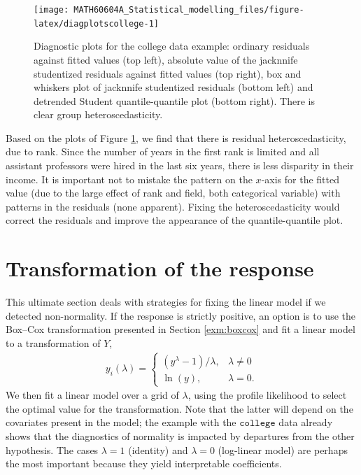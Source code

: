 \documentclass[
  11pt,
  letterpaper,
]{book}
\theoremstyle{definition}
\theoremstyle{definition}
\theoremstyle{definition}
\theoremstyle{remark}
\begin{document}
\begin{figure}

{\centering \texttt{[image: MATH60604A\_Statistical\_modelling\_files/figure-latex/diagplotscollege-1]} 

}

\caption{Diagnostic plots for the college data example: ordinary residuals against fitted values (top left), absolute value of the jacknnife studentized residuals against fitted values (top right), box and whiskers plot of jacknnife studentized residuals (bottom left) and detrended Student quantile-quantile plot (bottom right). There is clear group heteroscedasticity.}\label{fig:diagplotscollege}
\end{figure}

Based on the plots of Figure \ref{fig:diagplotscollege}, we find that there is residual heteroscedasticity, due to rank. Since the number of years in the first rank is limited and all assistant professors were hired in the last six years, there is less disparity in their income. It is important not to mistake the pattern on the \(x\)-axis for the fitted value (due to the large effect of rank and field, both categorical variable) with patterns in the residuals (none apparent). Fixing the heteroscedasticity would correct the residuals and improve the appearance of the quantile-quantile plot.

\hypertarget{transformation-response}{%
\section{Transformation of the response}\label{transformation-response}}

This ultimate section deals with strategies for fixing the linear model if we detected non-normality. If the response is strictly positive, an option is to use the Box--Cox transformation presented in Section \ref{exm:boxcox} and fit a linear model to a transformation of \(Y\),
\begin{align*}
y_i(\lambda)= \begin{cases}
(y^{\lambda}-1)/\lambda, & \lambda \neq 0\\
\ln(y), & \lambda=0.
\end{cases}
\end{align*}
We then fit a linear model over a grid of \(\lambda\), using the profile likelihood to select the optimal value for the transformation. Note that the latter will depend on the covariates present in the model; the example with the \(\texttt{college}\) data already shows that the diagnostics of normality is impacted by departures from the other hypothesis. The cases \(\lambda=1\) (identity) and \(\lambda=0\) (log-linear model) are perhaps the most important because they yield interpretable coefficients.
\end{document}
